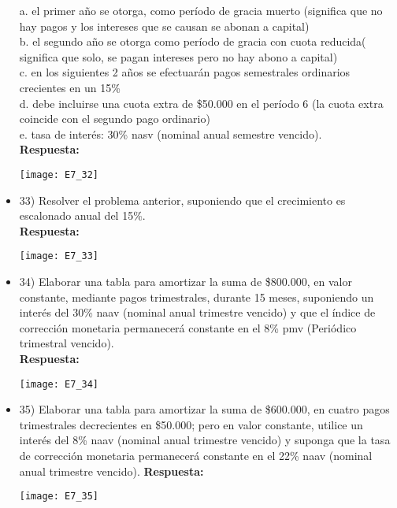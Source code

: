\begin{itemize}
	a.	el primer año se otorga, como período de gracia muerto (significa que no hay pagos y los intereses que se causan se abonan a capital)\\
	b.	el segundo año se otorga como período de gracia con cuota reducida( significa que solo, se pagan intereses pero no hay abono a capital) \\
	c.	en los siguientes 2 años se efectuarán pagos semestrales ordinarios crecientes en un 15\% \\
	d.	debe incluirse una cuota extra de \$50.000 en el período 6 (la cuota extra coincide con el segundo pago ordinario) \\
	e.	tasa de interés: 30\% nasv (nominal anual semestre vencido).\\
	
	\textbf{ Respuesta:}
	\begin{center}
		\texttt{[image: E7\_32]}
	\end{center}
	\medskip
	
	\item 33)	 Resolver el problema anterior, suponiendo que el crecimiento es escalonado anual del 15\%. \\
	\textbf{Respuesta:}
	\begin{center}
		\texttt{[image: E7\_33]}
	\end{center}
	\medskip
	
	\item 34) Elaborar una tabla para amortizar la suma de \$800.000, en valor constante, mediante pagos trimestrales, durante 15 meses, suponiendo un interés del 30\% naav (nominal anual trimestre vencido) y que el índice de corrección monetaria permanecerá constante en el 8\% pmv (Periódico trimestral vencido).\\
	\textbf{ Respuesta:}
	\begin{center}
		\texttt{[image: E7\_34]}
	\end{center}
	\medskip
	
	\item 35)   Elaborar una tabla para amortizar la suma de \$600.000, en cuatro pagos trimestrales decrecientes en \$50.000; pero en valor constante, utilice un interés del 8\% naav (nominal anual trimestre vencido) y suponga que la tasa de corrección monetaria permanecerá constante en el 22\% naav (nominal anual trimestre vencido). 
	\textbf{Respuesta:}
	\begin{center}
		\texttt{[image: E7\_35]}
	\end{center}
	\medskip
	

\end{itemize}
